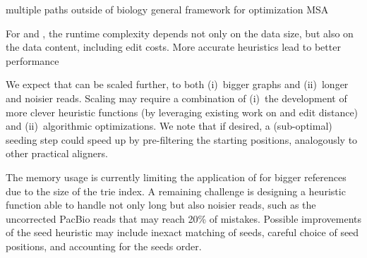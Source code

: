 multiple paths
outside of biology
general framework for optimization
MSA

For \dijkstra and \astarix, the runtime complexity depends not only on the data
size, but also on the data content, including edit costs. More accurate
heuristics lead to better \A performance~\cite{pearl_discovery_1983}

We expect that \astarix can be scaled further, to both (i)~bigger graphs and
(ii)~longer and noisier reads. Scaling \astarix may require a combination of
(i)~the development of more clever heuristic functions (by leveraging existing
work on \A and edit distance) and (ii)~algorithmic optimizations. We note that
if desired, a (sub-optimal) seeding step could speed up \astarix by
pre-filtering the starting positions, analogously to other practical aligners.

The memory usage is currently limiting the application of \astarix for bigger
references due to the size of the trie index. A remaining challenge is designing
a heuristic function able to handle not only long but also noisier reads, such
as the uncorrected PacBio reads that may reach 20\% of mistakes. Possible
improvements of the seed heuristic may include inexact matching of seeds,
careful choice of seed positions, and accounting for the seeds order.

